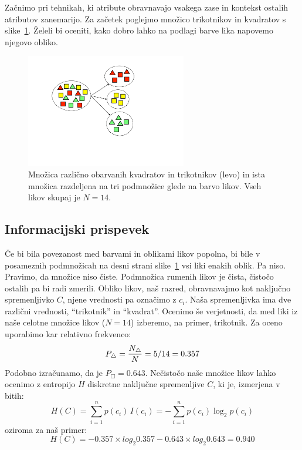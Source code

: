 Začnimo pri tehnikah, ki atribute obravnavajo vsakega zase in kontekst ostalih atributov zanemarijo. Za začetek poglejmo množico trikotnikov in kvadratov s slike~\ref{f-squares-triangles}. Želeli bi oceniti, kako dobro lahko na podlagi barve lika napovemo njegovo obliko. 

\begin{figure}[htbp]
\begin{center}
\includegraphics[width=7cm]{slike/squares-triangles.pdf}
\caption{Množica različno obarvanih kvadratov in trikotnikov (levo) in ista množica razdeljena na tri podmnožice glede na barvo likov. Vseh likov skupaj je $N=14$.}
\label{f-squares-triangles}
\end{center}
\end{figure}

\subsection{Informacijski prispevek}

Če bi bila povezanost med barvami in oblikami likov popolna, bi bile v posameznih podmnožicah na desni strani slike~\ref{f-squares-triangles} vsi liki enakih oblik. Pa niso. Pravimo, da množice niso čiste. Podmnožica rumenih likov je čista, čistočo ostalih pa bi radi zmerili. Obliko likov, naš razred, obravnavajmo kot naključno spremenljivko $C$, njene vrednosti pa označimo z $c_i$. Naša spremenljivka ima dve različni vrednosti, ``trikotnik'' in ``kvadrat''. Ocenimo še verjetnosti, da med liki iz naše celotne množice likov ($N=14$) izberemo, na primer, trikotnik. Za oceno uporabimo kar relativno frekvenco:
%
$$ P_{\triangle}={N_{\triangle} \over N} = 5/14 = 0.357 $$
%
Podobno izračunamo, da je $P_{\Box}= 0.643$. Nečistočo naše množice likov lahko ocenimo z entropijo $H$ diskretne naključne spremenljive $C$, ki je, izmerjena v bitih:
%
$$ H(C) = \sum_{i=1}^n {p(c_i)\,I(c_i)} = -\sum_{i=1}^n {p(c_i) \log_2 p(c_i)} $$
%
oziroma za naš primer:
$$ H(C) = - 0.357 \times log_2 0.357 - 0.643 \times log_2 0.643 = 0.940 $$

